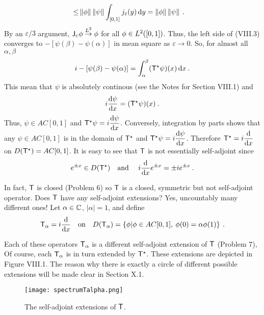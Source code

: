 \begin{example}
\begin{align}
     \leq&
      \left \Vert \phi \right \Vert \left \Vert \psi \right \Vert \int_{[0,1]} j_\varepsilon(y) \, \mathrm{d} y 
     =
      \left \Vert \phi \right \Vert \left \Vert \psi \right \Vert \:.
\end{align}
By an $\varepsilon/3$ argument, $\mathsf{J}_\varepsilon \phi \overset{L^2}\rightarrow \phi$ for all $\phi \in L^{2}([0,1])$.
Thus, the left side of (VIII.3)
converges to $-[\psi(\beta) - \psi(\alpha)]$ in mean square as $\varepsilon \rightarrow 0$. So, for almost all $\alpha, \beta$ \begin{align}
    i-[\psi(\beta) - \psi(\alpha)] = \int_\alpha^\beta (\mathsf{T}^\star \psi)(x) \, \mathrm{d} x \:.
\end{align}
This mean that $\psi$ is absolutely continous (see the Notes for Section VIII.1) and \begin{align}
    i \dfrac{\mathrm{d}\psi}{\mathrm{d}x} = (\mathsf{T}^\star \psi)(x) \:.
\end{align}
Thus, $\psi \in AC[0,1]$ and $\mathsf{T}^\star \psi = i \dfrac{\mathrm{d}\psi}{\mathrm{d}x} $. Conversely, integration by parts
shows that any $\psi \in AC[0,1]$ is in the domain of $\mathsf{T}^\star$ and $\mathsf{T}^\star \psi = i \dfrac{\mathrm{d}\psi}{\mathrm{d}x}$. Therefore $\mathsf{T}^\star = i \dfrac{\mathrm{d}}{\mathrm{d}x}$ on $D(\mathsf{T}^\star) = AC[0,1]$.
It is easy to see that $\mathsf{T}$ is not essentially self-adjoint since \begin{align}
    e^{\pm x} \in D(\mathsf{T}^\star) \quad \text{and } \quad i \dfrac{\mathrm{d}}{\mathrm{d}x} e^{\pm x} = \pm i e^{\pm x} \:.
\end{align}

In fact, $\mathsf{T}$ is closed (Problem 6) so $\mathsf{T}$ is a closed, symmetric but not self-adjoint operator.
Does $\mathsf{T}$ have any self-adjoint extensions? Yes, uncountably many different ones! Let $\alpha \in \mathbb{C}$, $|\alpha| = 1$, and define
\begin{align}
    \mathsf{T}_\alpha = i \dfrac{\mathrm{d}}{\mathrm{d}x} \quad \text{on} \quad D(\mathsf{T}_\alpha) = \left \lbrace \phi | \phi \in AC[0,1] , \: \phi(0) = \alpha \phi(1) \right \rbrace \:.
\end{align}

Each of these operators $\mathsf{T}_\alpha$ is a different self-adjoint extension of $\mathsf{T}$ (Problem 7),
Of course, each $\mathsf{T}_\alpha$ is in turn extended by $\mathsf{T}^\star$. These extensions are depicted in Figure VIII.1. The reason why there is exactly a circle of different possible extensions will be made clear in Section X.1.

\begin{figure}[H]
    \centering
    \texttt{[image: spectrumTalpha.png]}
    \caption{The self-adjoint extensions of $\mathsf{T}$.}
\end{figure}

\end{example}